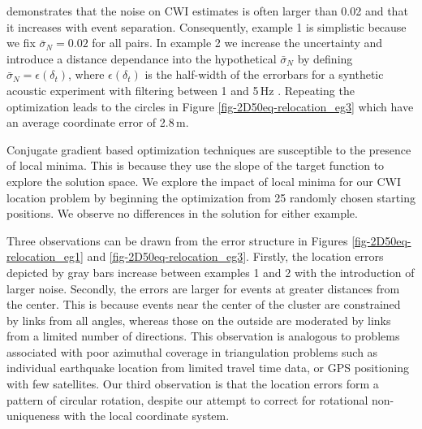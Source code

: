 \documentclass[extra, onecolumn, doublespacing]{gji}
\begin{document}
\citet{dr_Robinson11a} demonstrates that the noise on CWI estimates
is often larger than 0.02 and that it increases with event
separation. Consequently, example 1 is simplistic because we fix
$\bar{\sigma}_N=0.02$ for all pairs. In example 2 we increase the
uncertainty and introduce a distance dependance into the
hypothetical $\bar{\sigma}_N$ by defining
$\bar{\sigma}_N=\epsilon(\delta_t)$, where
$\epsilon(\delta_t)$ is the half-width of the errorbars for a
synthetic acoustic experiment with filtering between 1 and 5\,Hz
\citep[see Fig. 4(b) of ][]{dr_Robinson11a}. Repeating the
optimization leads to the circles in Figure
\ref{fig-2D50eq-relocation_eg3} which have an average coordinate
error of 2.8\,m.

Conjugate gradient based optimization techniques are susceptible to
the presence of local minima. This is because they use the slope of
the target function to explore the solution space. We explore the
impact of local minima for our CWI location problem by beginning the
optimization from 25 randomly chosen starting positions. We observe
no differences in the solution for either example.

Three observations can be drawn from the error structure in Figures
\ref{fig-2D50eq-relocation_eg1} and \ref{fig-2D50eq-relocation_eg3}.
Firstly, the location errors depicted by gray bars increase between
examples 1 and 2 with the introduction of larger noise. Secondly,
the errors are larger for events at greater distances from the
center. This is because events near the center of the cluster are
constrained by links from all angles, whereas those on the outside
are moderated by links from a limited number of directions. This
observation is analogous to problems associated with poor azimuthal
coverage in triangulation problems such as individual earthquake
location from limited travel time data, or GPS positioning with few
satellites. Our third observation is that the location errors form a
pattern of circular rotation, despite our attempt to correct for
rotational non-uniqueness with the local coordinate system.
\end{document}
